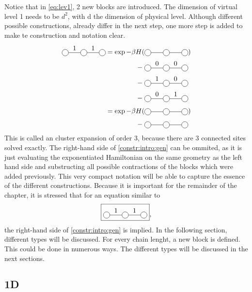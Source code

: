 \documentclass[twocolumn]{article}
\newcounter{a}
\newcounter{b}
\begin{document}
Notice that in \cref{eq:lev1}, 2 new blocks are introduced. The dimension of virtual level 1 needs to be $d^2$, with d the dimension of physical level. Although different possible constructions, already differ in the next step, one more step is added to make te construction and notation clear.
\begin{equation}\label{constr:intro:gen}
    \begin{split}
        \mpob{3}{ {0,1,1,0}  }{}{}{}{{,,,}}  = \exp  -\beta H( &\mpob{3}{ {,,,} }{}{}{}{{,,}})  \\
        - \;&\mpob{3}{ {0,0,0,0}  }{}{}{}{{,,,}}\\
        - \; &\mpob{3}{ {0,1,0,0}  }{}{}{}{{,,,}}\\
        - \; &\mpob{3}{ {0,0,1,0}  }{}{}{}{{,,,}}\\[3pt]
        =\exp  -\beta H( &\mpob{3}{ {,,,} }{}{}{}{{,,}})\\[3pt]
        - \; &\mpob{3}{ {,,,}  }{}{}{}{{,,,}}\\
    \end{split}
\end{equation}
This is called an cluster expansion of order 3, because there are 3 connected sites solved exactly. The right-hand side of \cref{constr:intro:gen} can be ommited, as it is just evaluating the exponentiated Hamiltonian on the same geometry as the left hand side and substructing all possible contractions of the blocks which were added previously. This very compact notation will be able to capture the essence of the different constructions. Because it is important for the remainder of the chapter, it is stressed that for an equation similar to
\begin{equation}
    \boxed{\mpob{3}{ {0,1,1,0}  }{}{}{}{{,,,}} },
\end{equation}
the right-hand side of \cref{constr:intro:gen} is implied. In the following section, different types will be discussed. For every chain lenght, a new block is defined. This could be done in numerous ways. The different types will be discussed in the next sections.

\subsection{1D}
\end{document}
